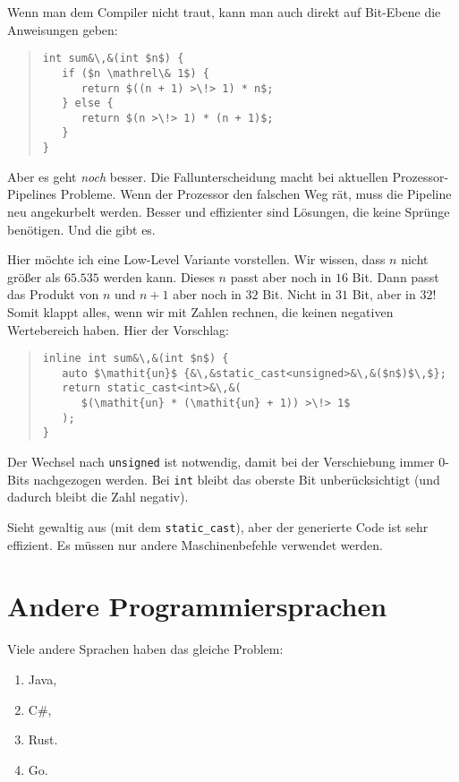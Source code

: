 \documentclass[a5paper,landscape,ngerman,10pt]{article}
\begin{document}
Wenn man dem Compiler nicht traut, kann man auch direkt
auf Bit-Ebene die Anweisungen geben:

\begin{quotation}
\begin{lstlisting}
int sum&\,&(int $n$) {
   if ($n \mathrel\& 1$) {
      return $((n + 1) >\!> 1) * n$;
   } else {
      return $(n >\!> 1) * (n + 1)$;
   }
}
\end{lstlisting}
\end{quotation}

Aber es geht \textit{noch\/} besser.
Die Fallunterscheidung macht bei aktuellen Prozessor-Pipelines
Probleme.
Wenn der Prozessor den falschen Weg rät, muss die
Pipeline neu angekurbelt werden.
Besser und effizienter sind Lösungen, die keine
Sprünge benötigen.
Und die gibt es.

Hier möchte ich eine Low-Level Variante vorstellen.
Wir wissen, dass $n$ nicht größer als $65.535$ werden
kann.
Dieses $n$ passt aber noch in $16$ Bit.
Dann passt das Produkt von $n$ und $n+1$ aber noch in
$32$ Bit.
Nicht in $31$ Bit, aber in $32$!
Somit klappt alles, wenn wir mit Zahlen rechnen, die
keinen negativen Wertebereich haben.
Hier der Vorschlag:

\begin{quotation}
\begin{lstlisting}
inline int sum&\,&(int $n$) {
   auto $\mathit{un}$ {&\,&static_cast<unsigned>&\,&($n$)$\,$};
   return static_cast<int>&\,&(
      $(\mathit{un} * (\mathit{un} + 1)) >\!> 1$
   );
}
\end{lstlisting}
\end{quotation}

Der Wechsel nach \lstinline!unsigned! ist notwendig, damit
bei der Verschiebung immer $0$-Bits nachgezogen werden.
Bei \lstinline!int! bleibt das oberste Bit unberücksichtigt
(und dadurch bleibt die Zahl negativ).

Sieht gewaltig aus (mit dem \lstinline!static_cast!), aber
der generierte Code ist sehr effizient.
Es müssen nur andere Maschinenbefehle verwendet werden.

\section{Andere Programmiersprachen}

Viele andere Sprachen haben das gleiche Problem:

\begin{enumerate}
 \item Java,
 \item C\#,
 \item Rust.
 \item Go.
\end{enumerate}
\end{document}
